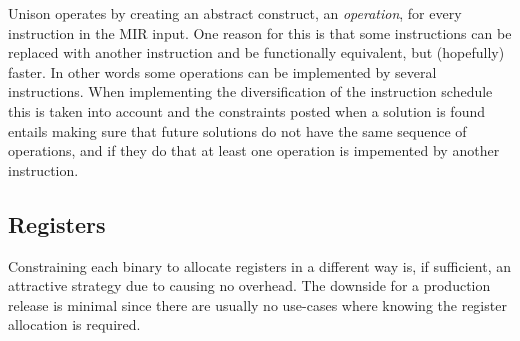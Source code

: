 Unison operates by creating an abstract construct, an \textit{operation}, for every instruction
in the MIR input. One reason for this is that some instructions can be replaced with another
instruction and be functionally equivalent, but (hopefully) faster. In other words some operations
can be implemented by several instructions. When implementing the diversification of the 
instruction schedule this is taken into account and the constraints posted when a solution
is found entails making sure that future solutions do not have the same sequence of 
operations, and if they do that at least one operation is impemented by another instruction.

\subsection{Registers}

Constraining each binary to allocate registers in a different way is, if sufficient, an
attractive strategy due to causing no overhead. The downside for a production release is
minimal since there are usually no use-cases where knowing the register allocation is required.
